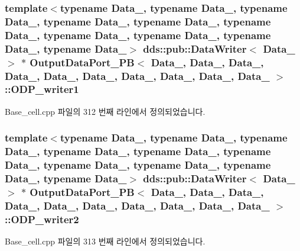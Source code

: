 \subsubsection[{\texorpdfstring{O\+D\+P\+\_\+writer1}{ODP_writer1}}]{\setlength{\rightskip}{0pt plus 5cm}template$<$typename Data\+\_, typename Data\+\_, typename Data\+\_, typename Data\+\_, typename Data\+\_, typename Data\+\_, typename Data\+\_, typename Data\+\_, typename Data\+\_, typename Data\+\_$>$ dds\+::pub\+::\+Data\+Writer$<$ Data\+\_ $>$ $\ast$ {\bf Output\+Data\+Port\+\_\+\+PB}$<$ Data\+\_, Data\+\_, Data\+\_, Data\+\_, Data\+\_, Data\+\_, Data\+\_, Data\+\_, Data\+\_, Data\+\_ $>$\+::O\+D\+P\+\_\+writer1}\hypertarget{classOutputDataPort__PB_ab739d73bd648f7818a08a5189b6faf0e}{}\label{classOutputDataPort__PB_ab739d73bd648f7818a08a5189b6faf0e}


Base\+\_\+cell.\+cpp 파일의 312 번째 라인에서 정의되었습니다.

\subsubsection[{\texorpdfstring{O\+D\+P\+\_\+writer2}{ODP_writer2}}]{\setlength{\rightskip}{0pt plus 5cm}template$<$typename Data\+\_, typename Data\+\_, typename Data\+\_, typename Data\+\_, typename Data\+\_, typename Data\+\_, typename Data\+\_, typename Data\+\_, typename Data\+\_, typename Data\+\_$>$ dds\+::pub\+::\+Data\+Writer$<$ Data\+\_ $>$ $\ast$ {\bf Output\+Data\+Port\+\_\+\+PB}$<$ Data\+\_, Data\+\_, Data\+\_, Data\+\_, Data\+\_, Data\+\_, Data\+\_, Data\+\_, Data\+\_, Data\+\_ $>$\+::O\+D\+P\+\_\+writer2}\hypertarget{classOutputDataPort__PB_afdadb002de2a43a95c91d59b79c055d2}{}\label{classOutputDataPort__PB_afdadb002de2a43a95c91d59b79c055d2}


Base\+\_\+cell.\+cpp 파일의 313 번째 라인에서 정의되었습니다.

